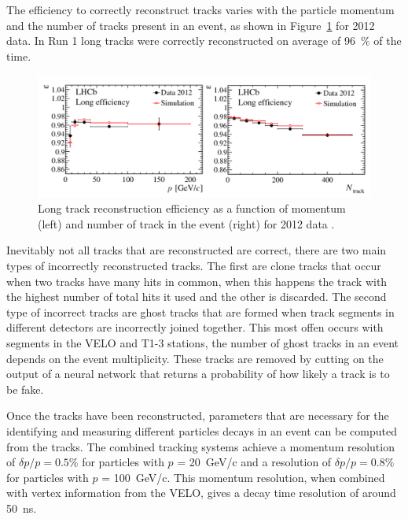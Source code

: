 The efficiency to correctly reconstruct tracks varies with the particle momentum and the number of tracks present in an event, as shown in Figure~\ref{fig:types_of_tracks} for 2012 data. In Run 1 long tracks were correctly reconstructed on average of 96~$\%$ of the time.





\begin{figure}[tb] 
  \centering    
  \includegraphics[width=1.0\textwidth]{./Figs/LHC_LHCb/LongTrack_efficiencies.png}
  \caption{Long track reconstruction efficiency as a function of momentum (left) and number of track in the event (right) for 2012 data \cite{Aaij:2014pwa}.}
  \label{fig:types_of_tracks}
\end{figure}




Inevitably not all tracks that are reconstructed are correct, there are two main types of incorrectly reconstructed tracks. The first are clone tracks that occur when two tracks have many hits in common, when this happens the track with the highest number of total hits it used and the other is discarded. The second type of incorrect tracks are ghost tracks that are formed when track segments in different detectors are incorrectly joined together. This most offen occurs with segments in the VELO and T1-3 stations, the number of ghost tracks in an event depends on the event multiplicity. These tracks are removed by cutting on the output of a neural network that returns a probability of how likely a track is to be fake.



Once the tracks have been reconstructed, parameters that are necessary for the identifying and measuring different particles decays in an event can be computed from the tracks. The combined tracking systems achieve a momentum resolution of $\delta p / p = 0.5\%$ for particles with $p$ =  20~GeV/c and a resolution of $\delta p / p = 0.8\%$ for particles with $p$ =  100~GeV/c.  This momentum resolution, when combined with vertex information from the VELO, gives a decay time resolution of around 50~ns. 



